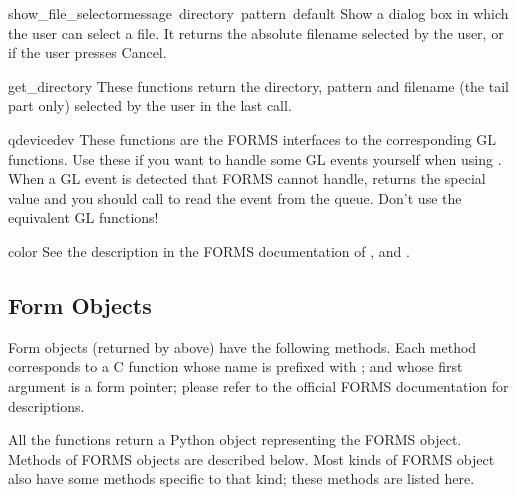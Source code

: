 \begin{funcdesc}{show_file_selector}{message\, directory\, pattern\, default}
Show a dialog box in which the user can select a file.  It returns
the absolute filename selected by the user, or  if the user
presses Cancel.
\end{funcdesc}

\begin{funcdesc}{get_directory}{}
These functions return the directory, pattern and filename (the tail
part only) selected by the user in the last 
call.
\end{funcdesc}

\begin{funcdesc}{qdevice}{dev}
These functions are the FORMS interfaces to the corresponding GL
functions.  Use these if you want to handle some GL events yourself
when using .  When a GL event is detected that
FORMS cannot handle,  returns the special value
 and you should call  to read the
event from the queue.  Don't use the equivalent GL functions!
\end{funcdesc}

\begin{funcdesc}{color}{}
See the description in the FORMS documentation of ,
 and .
\end{funcdesc}

\subsection{Form Objects}

Form objects (returned by  above) have the
following methods.  Each method corresponds to a C function whose name
is prefixed with ; and whose first argument is a form
pointer; please refer to the official FORMS documentation for
descriptions.

All the  functions return a Python object representing
the FORMS object.  Methods of FORMS objects are described below.  Most
kinds of FORMS object also have some methods specific to that kind;
these methods are listed here.


